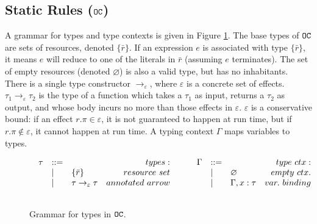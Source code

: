 \subsection{Static Rules ($\mathtt{OC}$)}

A grammar for types and type contexts is given in Figure \ref{fig:opercalc_types}. The base types of $\mathtt{OC}$ are sets of resources, denoted $\{ \bar r\}$. If an expression $e$ is associated with type $\{ \bar r \}$, it means $e$ will reduce to one of the literals in $\bar r$ (assuming $e$ terminates). The set of empty resources (denoted $\varnothing$) is also a valid type, but has no inhabitants. There is a single type constructor $\rightarrow_{\varepsilon}$, where $\varepsilon$ is a concrete set of effects. $\tau_1 \rightarrow_{\varepsilon} \tau_2$ is the type of a function which takes a $\tau_1$ as input, returns a $\tau_2$ as output, and whose body incurs no more than those effects in $\varepsilon$. $\varepsilon$ is a conservative bound: if an effect $r.\pi \in \varepsilon$, it is not guaranteed to happen at run time, but if $r.\pi \notin \varepsilon$, it cannot happen at run time. A typing context $\Gamma$ maps variables to types. 

\begin{figure}[h]
\vspace{-5pt}

\[
\begin{array}{lll}

\begin{array}{lllr}

\tau & ::= & ~ & types: \\
		& | & \{ \bar r \} & resource~set \\
		& | & \tau \rightarrow_{\varepsilon} \tau & annotated~arrow \\ 
		&&\\
\end{array}

	\hspace{5ex}
    
\begin{array}{lllr}

\Gamma & ::= & ~ & type~ctx: \\
				& | & \varnothing & empty~ctx. \\
				& | & \Gamma, x: \tau & var.~binding \\
				&&\\
\end{array}

\end{array}
\]

\vspace{-7pt}
\caption{Grammar for types in $\mathtt{OC}$.}
\label{fig:opercalc_types}
\end{figure}

